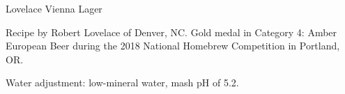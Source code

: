 \begin{recipe}{Lovelace Vienna Lager}

\begin{aboutblock}
Recipe by Robert Lovelace of Denver, NC. Gold medal in Category 4: Amber European
Beer during the 2018 National Homebrew Competition in Portland, OR. \sourceaha
\end{aboutblock}


\begin{methodandtiming}
 
\begin{mashsteps}
\end{mashsteps}

\begin{fermentationsteps}
\end{fermentationsteps}

\begin{directions}
Water adjustment: low-mineral water, mash pH of 5.2.
\end{directions}

\end{methodandtiming}

\recipebreak

\begin{ingredientsblock}

\begin{malts}
\end{malts}

\begin{hops}
\end{hops}


\end{ingredientsblock}

\end{recipe}

